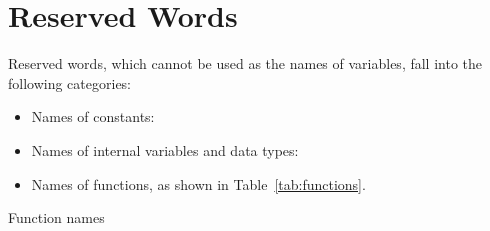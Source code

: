 \chapter{Reserved Words}
\label{reswords}

Reserved words, which cannot be used as the names of variables, fall
into the following categories:

\begin{itemize}
\item Names of constants:
  

\item Names of internal variables and data types:
  

\item Names of functions, as shown in Table~\ref{tab:functions}.
\end{itemize}

\begin{table}[htbp]
\caption{Function names}
\label{tab:functions}
\begin{center}

\end{center}
\end{table}

